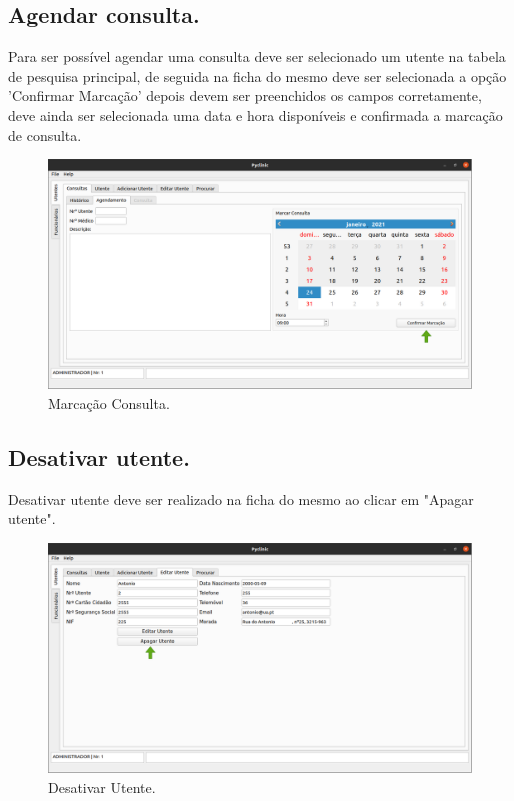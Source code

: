 \documentclass[11pt,a4paper,twoside]{article}
\begin{document}
\subsection{Agendar consulta.}
Para ser possível agendar uma consulta deve ser selecionado um utente na tabela de pesquisa principal, de seguida na ficha do mesmo deve ser selecionada a opção 'Confirmar Marcação' depois devem ser preenchidos os campos corretamente, deve ainda ser selecionada uma data e hora disponíveis e confirmada a marcação de consulta.

\begin{figure}[H]
	\centering
	\includegraphics[width=0.9\linewidth]{image/rececionista/marcarConsulta.png}
	\caption{Marcação Consulta.}
	\label{fig:marcarconsulta}
\end{figure}

\subsection{Desativar utente.}
Desativar utente deve ser realizado na ficha do mesmo ao clicar em "Apagar utente".

\begin{figure}[H]
	\centering
	\includegraphics[width=0.9\linewidth]{image/rececionista/apagarUtente.png}
	\caption{Desativar Utente.}
	\label{fig:desativarUtente}
\end{figure}
\end{document}
